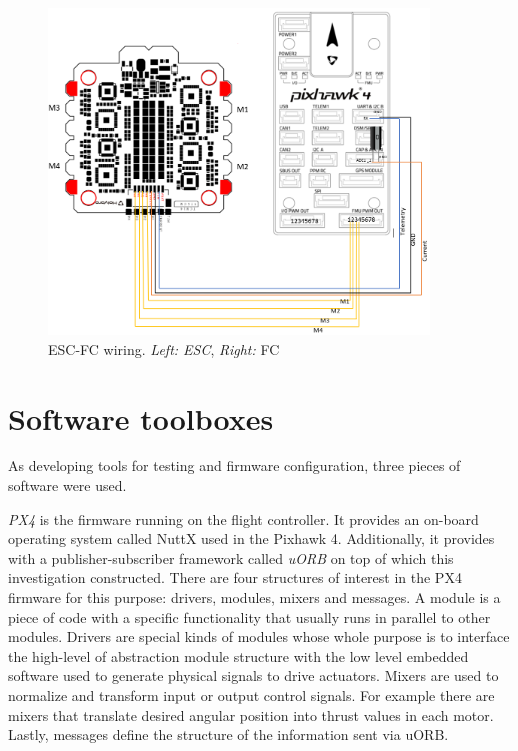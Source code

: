 \begin{figure} 
    \centering
    \includegraphics[width=0.9\textwidth]{images/esc_wiring.png}
    \caption{ESC-FC wiring. \textit{Left: ESC}, \textit{Right:} FC}
    \label{fig:esc_wiring}
\end{figure}

\section{Software toolboxes}
As developing tools for testing and firmware configuration, three pieces of software were used.
\newline

\textit{PX4} is the firmware running on the flight controller. It provides an on-board operating system called NuttX used in the Pixhawk 4. Additionally, it provides with a publisher-subscriber framework called \textit{uORB} on top of which this investigation constructed. There are four structures of interest in the PX4 firmware for this purpose: drivers, modules, mixers and messages. A module is a piece of code with a specific functionality that usually runs in parallel to other modules. Drivers are special kinds of modules whose whole purpose is to interface the high-level of abstraction module structure with the low level embedded software used to generate physical signals to drive actuators. Mixers are used to normalize and transform input or output control signals. For example there are mixers that translate desired angular position into thrust values in each motor. Lastly, messages define the structure of the information sent via uORB.
\newline

